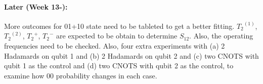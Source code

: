 \documentclass[letterpaper]{article}
\numberwithin{equation}{section} %
\numberwithin{figure}{section} %
\numberwithin{table}{section} %
\begin{document}
\paragraph{Later (Week 13-):}
More outcomes for 01+10 state need to be tableted to get a better fitting. ${T_2}^(1)$, ${T_2}^(2)$, ${T_2}^+$, ${T_2}^-$ are expected to be obtain to determine $S_{12}$. Also, the operating frequencies need to be checked. Also, four extra experiments with (a) 2 Hadamards on qubit 1 and (b) 2 Hadamards on qubit 2 and (c) two CNOTS with qubit 1 as the control and (d)  two CNOTS with qubit 2 as the control, to examine how 00 probability changes in each case. 

\begin{comment}

$$\frac{1}{{T_2}^{\pm}}=\frac{1}{{T_2}^{(1)}}+\frac{1}{{T_2}^{(2)}}\pm \frac{8}{\hbar^2} \lim_{\omega\to\infty} S_{12}(\omega)$$


\section{An IDLA Simulation and the Boundary}

\subsection{An IDLA Simulation with N Particles}



\subsubsection{Particles move in 8 directions}

\begin{comment}
\begin{figure}[htbp]
	\centering
	\begin{subfigure}[b]{0.3\textwidth}
		\texttt{[image: 8direct\_Npart100\_3suW11T]}
		\caption{\texttt{Npart = 100}}
		\label{8direct_Npart100_3suW11T}
	\end{subfigure}
	\begin{subfigure}[b]{0.3\textwidth}
		\texttt{[image: 8direct\_Npart1000\_3suW11T]}
		\caption{\texttt{Npart = 1000}}
		\label{8direct_Npart1000_3suW11T}
	\end{subfigure}
	\begin{subfigure}[b]{0.3\textwidth}
		\texttt{[image: 8direct\_Npart10000\_3suW11T]}
		\caption{\texttt{Npart = 10000}}
		\label{8direct_Npart10000_3suW11T}
	\end{subfigure}
	\caption{IDLA simulation with 8 directions}
	\label{IDLA simulation with 8 directions}
\end{figure}
\end{comment}
	
\end{document}

